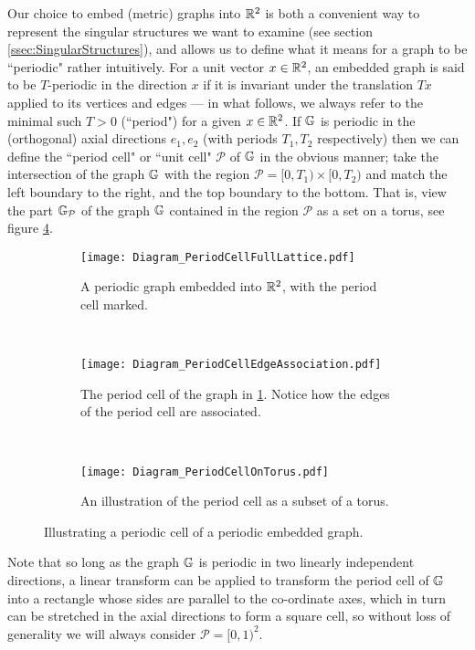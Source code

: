 Our choice to embed (metric) graphs into $\mathbb{R}^2$ is both a convenient way to represent the singular structures we want to examine (see section \ref{ssec:SingularStructures}), and allows us to define what it means for a graph to be ``periodic" rather intuitively.
For a unit vector $x\in\mathbb{R}^2$, an embedded graph is said to be $T$-periodic in the direction $x$ if it is invariant under the translation $Tx$ applied to its vertices and edges --- in what follows, we always refer to the minimal such $T>0$ (``period") for a given $x\in\mathbb{R}^2$.
If $\mathbb{G}$ is periodic in the (orthogonal) axial directions $e_1, e_2$ (with periods $T_1, T_2$ respectively) then we can define the ``period cell" or ``unit cell" $\mathcal{P}$ of $\mathbb{G}$ in the obvious manner; take the intersection of the graph $\mathbb{G}$ with the region $\mathcal{P} = [0,T_1)\times [0,T_2)$ and match the left boundary to the right, and the top boundary to the bottom.
That is, view the part $\mathbb{G}_{\mathcal{P}}$ of the graph $\mathbb{G}$ contained in the region $\mathcal{P}$ as a set on a torus, see figure \ref{fig:PeriodCellIllustration}.
\begin{figure}[t!]
	\centering
	\begin{subfigure}[t]{0.45\textwidth}
		\centering
		\texttt{[image: Diagram\_PeriodCellFullLattice.pdf]}
		\caption{\label{fig:Diagram_PeriodCellFullLattice} A periodic graph embedded into $\mathbb{R}^2$, with the period cell marked.}
	\end{subfigure}
	~
	\begin{subfigure}[t]{0.45\textwidth}
		\centering
		\texttt{[image: Diagram\_PeriodCellEdgeAssociation.pdf]}
		\caption{\label{fig:Diagram_PeriodCellEdgeAssociation} The period cell of the graph in \ref{fig:Diagram_PeriodCellFullLattice}. Notice how the edges of the period cell are associated.}
	\end{subfigure}
	\\
	\begin{subfigure}[b]{0.75\textwidth}
		\centering
		\texttt{[image: Diagram\_PeriodCellOnTorus.pdf]}
		\caption{\label{fig:Diagram_PeriodCellOnTorus} An illustration of the period cell as a subset of a torus.}
	\end{subfigure}
	\caption{\label{fig:PeriodCellIllustration} Illustrating a periodic cell of a periodic embedded graph.}
\end{figure} 
Note that so long as the graph $\mathbb{G}$ is periodic in two linearly independent directions, a linear transform can be applied to transform the period cell of $\mathbb{G}$ into a rectangle whose sides are parallel to the co-ordinate axes, which in turn can be stretched in the axial directions to form a square cell, so without loss of generality we will always consider $\mathcal{P}=[0,1)^2$.
